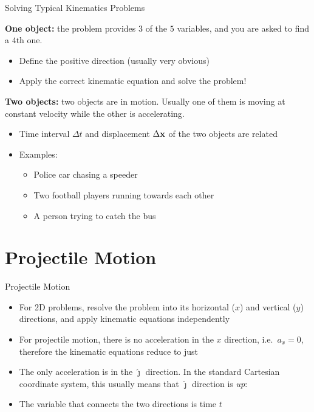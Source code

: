 \documentclass[12pt,compress,aspectratio=169]{beamer}
\newcommand{\mb}[1]{\ensuremath\mathbf{#1}}
\newcommand{\eq}[2]{\vspace{#1}{\Large\begin{displaymath}#2\end{displaymath}}}
\begin{document}
\begin{frame}{Solving Typical Kinematics Problems}
  
  \textbf{One object:} the problem provides $3$ of the $5$ variables, and you
  are asked to find a $4$th one.
  \begin{itemize}
  \item Define the positive direction (usually very obvious)
  \item Apply the correct kinematic equation and solve the problem!
  \end{itemize}

  \vspace{.2in}\textbf{Two objects:} two objects are in motion. Usually one of
  them is moving at constant velocity while the other is accelerating.
  \begin{itemize}
  \item Time interval $\Delta t$ and displacement $\Delta\mb{x}$ of the two
    objects are related
  \item Examples:
    \begin{itemize}
    \item Police car chasing a speeder
    \item Two football players running towards each other
    \item A person trying to catch the bus
    \end{itemize}
  \end{itemize}
\end{frame}


\section{Projectile Motion}
\begin{frame}{Projectile Motion}
  \begin{itemize}
  \item For 2D problems, resolve the problem into its
    horizontal ($x$) and vertical ($y$) directions, and apply kinematic
    equations independently
  \item For projectile motion, there is no acceleration in the $x$ direction,
    i.e.\ $a_x=0$, therefore the kinematic equations reduce to just
    
    \eq{-.25in}{x=v_xt\bm{\hat{\imath}}}
  \item The only acceleration is in the $\bm{\hat{\jmath}}$ direction. In the
    standard Cartesian coordinate system, this usually means that
    $\bm{\hat{\jmath}}$ direction is \emph{up}:
    
    \eq{-.25in}{a_y=-g\bm{\hat{\jmath}}}
  \item The variable that connects the two directions is time $t$
  \end{itemize}
\end{frame}
\end{document}
